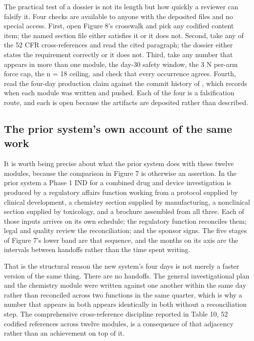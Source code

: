 The practical test of a dossier is not its length but how quickly a reviewer can
falsify it. Four checks are available to anyone with the deposited files and no
special access. First, open Figure 8's crosswalk and pick any codified content
item; the named section file either satisfies it or it does not. Second, take
any of the 52 CFR cross-references and read the cited paragraph; the dossier
either states the requirement correctly or it does not. Third, take any number
that appears in more than one module, the day-30 safety window, the 3 N per-arm
force cap, the n = 18 ceiling, and check that every occurrence agrees. Fourth,
read the four-day production claim against the commit history of
, which records when each module was written and pushed. Each
of the four is a falsification route, and each is open because the artifacts are
deposited rather than described.

\subsection{The prior system's own account of the same work}

It is worth being precise about what the prior system does with these twelve
modules, because the comparison in Figure 7 is otherwise an assertion. In the
prior system a Phase 1 IND for a combined drug and device investigation is
produced by a regulatory affairs function working from a protocol supplied by
clinical development, a chemistry section supplied by manufacturing, a
nonclinical section supplied by toxicology, and a brochure assembled from all
three. Each of those inputs arrives on its own schedule; the regulatory function
reconciles them; legal and quality review the reconciliation; and the sponsor
signs. The five stages of Figure 7's lower band are that sequence, and the
months on its axis are the intervals between handoffs rather than the time spent
writing.

That is the structural reason the new system's four days is not merely a faster
version of the same thing. There are no handoffs. The general investigational
plan and the chemistry module were written against one another within the same
day rather than reconciled across two functions in the same quarter, which is
why a number that appears in both appears identically in both without a
reconciliation step. The comprehensive cross-reference discipline reported in
Table 10, 52 codified references across twelve modules, is a consequence of that
adjacency rather than an achievement on top of it.

